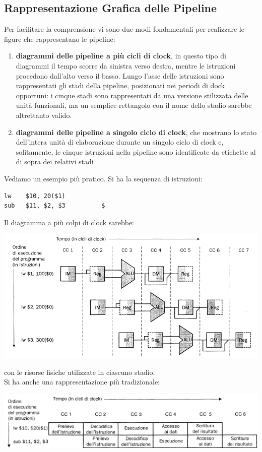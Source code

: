 \documentclass[a4paper,12pt, oneside]{book}
\begin{document}
\subsection{Rappresentazione Grafica delle Pipeline}
Per facilitare la comprensione vi sono due modi fondamentali per
realizzare le figure che rappresentano le pipeline:
\begin{enumerate}
  \item \textbf{diagrammi delle pipeline a più cicli di clock}, in
  questo tipo di diagrammi il tempo scorre da sinistra verso destra,
  mentre le istruzioni procedono dall'alto verso il basso. Lungo
  l'asse delle istruzioni sono rappresentati gli stadi della pipeline,
  posizionati nei periodi di dock opportuni: i cinque stadi sono
  rappresentati da una versione stilizzata delle unità funzionali,
  ma un semplice rettangolo con il nome dello stadio
  sarebbe altrettanto valido.
  \item \textbf{diagrammi delle pipeline a singolo ciclo di clock},
  che mostrano lo stato dell'intera
  unità di elaborazione durante un singolo ciclo di clock e,
  solitamente, le cinque istruzioni nella pipeline sono identificate
  da etichette al di sopra dei relativi stadi
\end{enumerate}
\newpage
Vediamo un esempio più pratico. Si ha la sequenza di istruzioni:
\begin{verbatim}
lw    $10, 20($1)
sub   $11, $2, $3          $
\end{verbatim}
Il diagramma a più colpi di clock sarebbe:
\begin{center}
  \includegraphics[scale = 0.7]{img/piper.png}
\end{center}
con le risorse fisiche utilizzate in ciascuno stadio.\\
Si ha anche una rappresentazione più tradizionale:
\begin{center}
  \includegraphics[scale = 0.7]{img/piper2.png}
\end{center}
\end{document}
